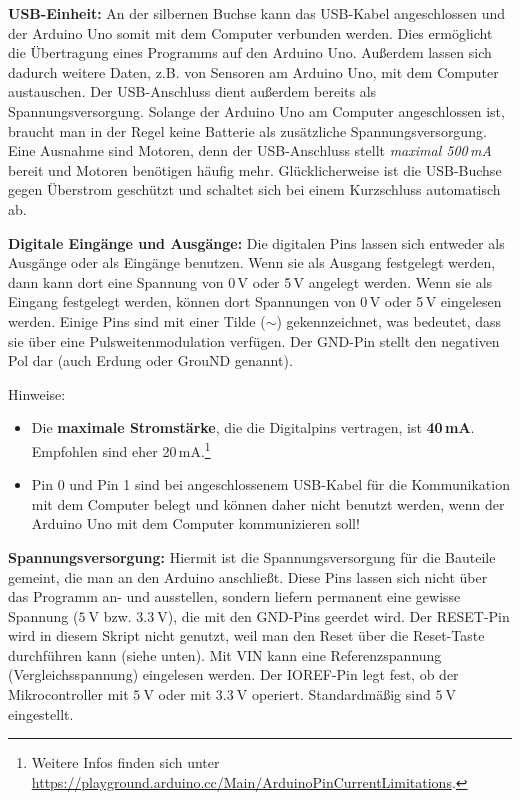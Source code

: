 \textbf{USB-Einheit:} An der silbernen Buchse kann das USB-Kabel angeschlossen und der Arduino Uno somit mit dem Computer verbunden werden. Dies ermöglicht die Übertragung eines Programms auf den Arduino Uno. Außerdem lassen sich dadurch weitere Daten, z.B. von Sensoren am Arduino Uno, mit dem Computer austauschen. Der USB-Anschluss dient außerdem bereits als Spannungsversorgung. Solange der Arduino Uno am Computer angeschlossen ist, braucht man in der Regel keine Batterie als zusätzliche Spannungsversorgung. Eine Ausnahme sind Motoren, denn der USB-Anschluss stellt \emph{maximal 500\,mA} bereit und Motoren benötigen häufig mehr. Glücklicherweise ist die USB-Buchse gegen Überstrom geschützt und schaltet sich bei einem Kurzschluss automatisch ab.

\textbf{Digitale Eingänge und Ausgänge:} Die digitalen Pins lassen sich entweder als Ausgänge oder als Eingänge benutzen. Wenn sie als Ausgang festgelegt werden, dann kann dort eine Spannung von 0\,V oder 5\,V angelegt werden. Wenn sie als Eingang festgelegt werden, können dort Spannungen von 0\,V oder 5\,V eingelesen werden. Einige Pins sind mit einer Tilde ($\sim$) gekennzeichnet, was bedeutet, dass sie über eine Pulsweitenmodulation verfügen. Der GND-Pin stellt den negativen Pol dar (auch Erdung oder GrouND genannt).

Hinweise: 
\begin{itemize}
	\item Die \textbf{maximale Stromstärke}, die die Digitalpins vertragen, ist \textbf{40\,mA}. Empfohlen sind eher 20\,mA.\footnote{Weitere Infos finden sich unter \url{https://playground.arduino.cc/Main/ArduinoPinCurrentLimitations}.}
	\item Pin 0 und Pin 1 sind bei angeschlossenem USB-Kabel für die Kommunikation mit dem Computer belegt und können daher nicht benutzt werden, wenn der Arduino Uno mit dem Computer kommunizieren soll!
\end{itemize}

\textbf{Spannungsversorgung:} Hiermit ist die Spannungsversorgung für die Bauteile gemeint, die man an den Arduino anschließt. Diese Pins lassen sich nicht über das Programm an- und ausstellen, sondern liefern permanent eine gewisse Spannung ($\SI{5}{\volt}$ bzw. $\SI{3,3}{\volt}$), die mit den GND-Pins geerdet wird. Der RESET-Pin wird in diesem Skript nicht genutzt, weil man den Reset über die Reset-Taste durchführen kann (siehe unten). Mit VIN kann eine Referenzspannung (Vergleichsspannung) eingelesen werden. Der IOREF-Pin legt fest, ob der Mikrocontroller mit $\SI{5}{\volt}$ oder mit $\SI{3,3}{\volt}$ operiert. Standardmäßig sind $\SI{5}{\volt}$ eingestellt.

